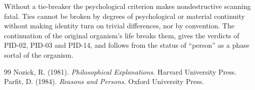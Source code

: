 \documentclass{situationist-preprint}
\begin{document}
Without a tie-breaker the psychological criterion makes nondestructive scanning fatal. Ties cannot be broken by degrees of psychological or material continuity without making identity turn on trivial differences, nor by convention. The continuation of the original organism's life breaks them, gives the verdicts of PID-02, PID-03 and PID-14, and follows from the status of \enquote{person} as a phase sortal of the organism.

\begin{thebibliography}{99}\small
{} Nozick, R. (1981). \emph{Philosophical Explanations}. Harvard University Press.
 Parfit, D. (1984). \emph{Reasons and Persons}. Oxford University Press.
\end{thebibliography}
\end{document}
